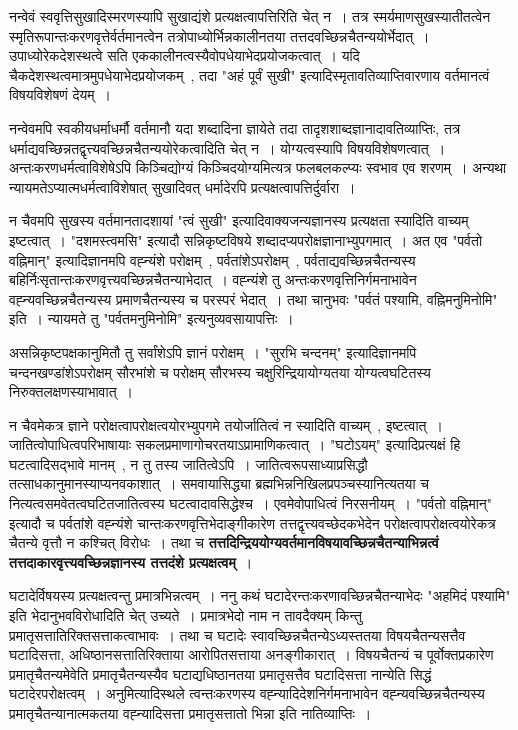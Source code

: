 	नन्वेवं स्ववृत्तिसुखादिस्मरणस्यापि सुखाद्यंशे प्रत्यक्षत्वापत्तिरिति चेत् न~। तत्र स्मर्यमाणसुखस्यातीतत्वेन स्मृतिरूपान्तःकरणवृत्तेर्वर्तमानत्वेन तत्रोपाध्योर्भिन्नकालीनतया तत्तदवच्छिन्नचैतन्ययोर्भेदात्~। उपाध्योरेकदेशस्थत्वे सति एककालीनत्वस्यैवोपधेयाभेदप्रयोजकत्वात्~। यदि चैकदेशस्थत्वमात्रमुपधेयाभेदप्रयोजकम्~, तदा "अहं पूर्वं सुखी" इत्यादिस्मृतावतिव्याप्तिवारणाय वर्तमानत्वं विषयविशेषणं देयम्~।\par
	नन्वेवमपि स्वकीयधर्माधर्मौ वर्तमानौ यदा शब्दादिना ज्ञायेते तदा तादृशशाब्दज्ञानादावतिव्याप्तिः, तत्र धर्माद्यवच्छिन्नतद्वृत्त्यवच्छिन्नचैतन्ययोरेकत्वादिति चेत् न~। योग्यत्वस्यापि विषयविशेषणत्वात्~। अन्तःकरणधर्मत्वाविशेषेऽपि किञ्चिद्योग्यं किञ्चिदयोग्यमित्यत्र फलबलकल्प्यः स्वभाव एव शरणम्~। अन्यथा न्यायमतेऽप्यात्मधर्मत्वाविशेषात् सुखादिवत् धर्मादेरपि प्रत्यक्षत्वापत्तिर्दुर्वारा~।\par
	न चैवमपि सुखस्य वर्तमानतादशायां "त्वं सुखी" इत्यादिवाक्यजन्यज्ञानस्य प्रत्यक्षता स्यादिति वाच्यम् इष्टत्वात्~। "दशमस्त्वमसि" इत्यादौ सन्निकृष्टविषये शब्दादप्यपरोक्षज्ञानाभ्युपगमात्~। अत एव "पर्वतो वह्निमान्" इत्यादिज्ञानमपि वह्न्यंशे परोक्षम्~, पर्वतांशेऽपरोक्षम्~, पर्वताद्यवच्छिन्नचैतन्यस्य बहिर्निःसृतान्तःकरणवृत्त्यवच्छिन्नचैतन्याभेदात्~। वह्न्यंशे तु अन्तःकरणवृत्तिनिर्गमनाभावेन वह्न्यवच्छिन्नचैतन्यस्य प्रमाणचैतन्यस्य च परस्परं भेदात्~। तथा चानुभवः "पर्वतं पश्यामि, वह्निमनुमिनोमि" इति~। न्यायमते तु "पर्वतमनुमिनोमि" इत्यनुव्यवसायापत्तिः~।\par असन्निकृष्टपक्षकानुमितौ तु सर्वांशेऽपि ज्ञानं परोक्षम्~। "सुरभि चन्दनम्" इत्यादिज्ञानमपि चन्दनखण्डांशेऽपरोक्षम् सौरभांशे च परोक्षम् सौरभस्य चक्षुरिन्द्रियायोग्यतया योग्यत्वघटितस्य निरुक्तलक्षणस्याभावात्~।\par
	न चैवमेकत्र ज्ञाने परोक्षत्वापरोक्षत्वयोरभ्युपगमे तयोर्जातित्वं न स्यादिति वाच्यम्~, इष्टत्वात्~। जातित्वोपाधित्वपरिभाषायाः सकलप्रमाणागोचरतयाऽप्रामाणिकत्वात्~। "घटोऽयम्" इत्यादिप्रत्यक्षं हि घटत्वादिसद्भावे मानम्~, न तु तस्य जातित्वेऽपि~। जातित्वरूपसाध्याप्रसिद्धौ तत्साधकानुमानस्याप्यनवकाशात्~। समवायासिद्ध्या ब्रह्मभिन्ननिखिलप्रपञ्चस्यानित्यतया च नित्यत्वसमवेतत्वघटितजातित्वस्य घटत्वादावसिद्धेश्च~। एवमेवोपाधित्वं निरसनीयम्~। "पर्वतो वह्निमान्" इत्यादौ च पर्वतांशे वह्न्यंशे चान्तःकरणवृत्तिभेदाङ्गीकारेण तत्तद्वृत्त्यवच्छेदकभेदेन परोक्षत्वापरोक्षत्वयोरेकत्र चैतन्ये वृत्तौ न कश्चित् विरोधः~। तथा च {\bfseries तत्तदिन्द्रिययोग्यवर्तमानविषयावच्छिन्नचैतन्याभिन्नत्वं तत्तदाकारवृत्त्यवच्छिन्नज्ञानस्य तत्तदंशे प्रत्यक्षत्वम्}~।\par
	घटादेर्विषयस्य प्रत्यक्षत्वन्तु प्रमात्रभिन्नत्वम्~। ननु कथं घटादेरन्तःकरणावच्छिन्नचैतन्याभेदः "अहमिदं पश्यामि" इति भेदानुभवविरोधादिति चेत् उच्यते~। प्रमात्रभेदो नाम न तावदैक्यम् किन्तु प्रमातृसत्तातिरिक्तसत्ताकत्वाभावः~। तथा च घटादेः स्वावच्छिन्नचैतन्येऽध्यस्ततया विषयचैतन्यसत्तैव घटादिसत्ता, अधिष्ठानसत्तातिरिक्ताया आरोपितसत्ताया अनङ्गीकारात्~। विषयचैतन्यं च पूर्वोक्तप्रकारेण प्रमातृचैतन्यमेवेति प्रमातृचैतन्यस्यैव घटाद्यधिष्ठानतया प्रमातृसत्तैव घटादिसत्ता नान्येति सिद्धं घटादेरपरोक्षत्वम्~। अनुमित्यादिस्थले त्वन्तःकरणस्य वह्न्यादिदेशनिर्गमनाभावेन वह्न्यवच्छिन्नचैतन्यस्य प्रमातृचैतन्यानात्मकतया वह्न्यादिसत्ता प्रमातृसत्तातो भिन्ना इति नातिव्याप्तिः~।\par
